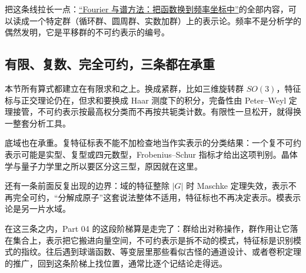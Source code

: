 把这条线拉长一点：\hyperref[ch:068]{``Fourier 与谱方法：把函数换到频率坐标中''}的全部内容，可以读成一个特定群（循环群、圆周群、实数加群）上的表示论。频率不是分析学的偶然发明，它是平移群的不可约表示的编号。

\subsection{有限、复数、完全可约，三条都在承重}

本节所有算式都建立在有限求和之上。换成紧群，比如三维旋转群 \(SO(3)\)，特征标与正交理论仍在，但求和要换成 Haar 测度下的积分，完备性由 Peter--Weyl 定理接管，不可约表示按最高权分类而不再按共轭类计数。有限性一旦松开，就得换一整套分析工具。

底域也在承重。复特征标表不能不加检查地当作实表示的分类结果：一个复不可约表示可能是实型、复型或四元数型，Frobenius--Schur 指标才给出这项判别。晶体学与量子力学里之所以要区分这三型，原因就在这里。

还有一条前面反复出现的边界：域的特征整除 \(|G|\) 时 Maschke 定理失效，表示不再完全可约，``分解成原子''这套说法整体不适用，特征标也不再决定表示。模表示论是另一片水域。

在这三条之内，Part 04 的这段阶梯算是走完了：群给出对称操作，群作用让它落在集合上，表示把它搬进向量空间，不可约表示是拆不动的模式，特征标是识别模式的指纹。往后遇到球谐函数、等变层里那些看似古怪的通道设计、或者卷积定理的推广，回到这条阶梯上找位置，通常比逐个记结论走得远。
